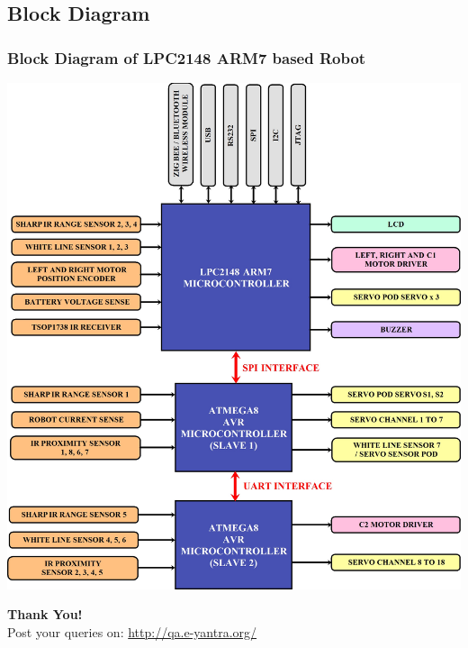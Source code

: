 \documentclass[10pt,red]{beamer}
\begin{document}

\subsection{Block Diagram}
\begin{frame}
	\frametitle{Block Diagram of LPC2148 ARM7 based Robot} \pause
		\includegraphics[scale=0.1]{block_diagram}
\end{frame}


\begin{frame}
\hskip4cm
\textbf{\LARGE Thank You!} \\[20pt]
\hskip3cm
\scriptsize Post your queries on: 
\hyperref[www.e-yantra.org]{\color{blue} http://qa.e-yantra.org/ \color{black}} 
\end{frame}
\end{document}
